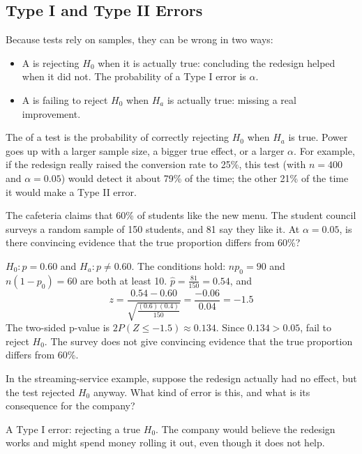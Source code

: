 \subsection{Type I and Type II Errors}

Because tests rely on samples, they can be wrong in two ways:
\begin{itemize}
\item A  is rejecting $H_0$ when it is actually true:
concluding the redesign helped when it did not. The probability of a Type I
error is $\alpha$.
\item A  is failing to reject $H_0$ when $H_a$ is
actually true: missing a real improvement.
\end{itemize}
The  of a test is the probability of correctly
rejecting $H_0$ when $H_a$ is true. Power goes up with a larger sample size,
a bigger true effect, or a larger $\alpha$. For example, if the redesign
really raised the conversion rate to 25\%, this test (with $n = 400$ and
$\alpha = 0.05$) would detect it about 79\% of the time; the other 21\% of
the time it would make a Type II error.

\begin{Exercise}[title={The Cafeteria Survey}, label=prop_test1]
The cafeteria claims that 60\% of students like the new menu. The student
council surveys a random sample of 150 students, and 81 say they like it.
At $\alpha = 0.05$, is there convincing evidence that the true proportion
differs from 60\%?
\end{Exercise}
\begin{Answer}[ref=prop_test1]
$H_0: p = 0.60$ and $H_a: p \neq 0.60$. The conditions hold: $np_0 = 90$
and $n(1-p_0) = 60$ are both at least 10. $\hat{p} = \frac{81}{150} = 0.54$, and
$$z = \frac{0.54 - 0.60}{\sqrt{\frac{(0.6)(0.4)}{150}}} = \frac{-0.06}{0.04} = -1.5$$
The two-sided p-value is $2P(Z \leq -1.5) \approx 0.134$. Since $0.134 >
0.05$, fail to reject $H_0$. The survey does not give convincing evidence
that the true proportion differs from 60\%.
\end{Answer}

\begin{Exercise}[title={Name the Error}, label=prop_test2]
In the streaming-service example, suppose the redesign actually had no
effect, but the test rejected $H_0$ anyway. What kind of error is this, and
what is its consequence for the company?
\end{Exercise}
\begin{Answer}[ref=prop_test2]
A Type I error: rejecting a true $H_0$. The company would believe the
redesign works and might spend money rolling it out, even though it does
not help.
\end{Answer}
